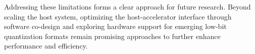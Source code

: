 Addressing these limitations forms a clear approach for future research. 
Beyond scaling the host system, optimizing the host-accelerator interface through software co-design and exploring hardware support for emerging low-bit quantization formats remain promising approaches to further enhance performance and efficiency.


